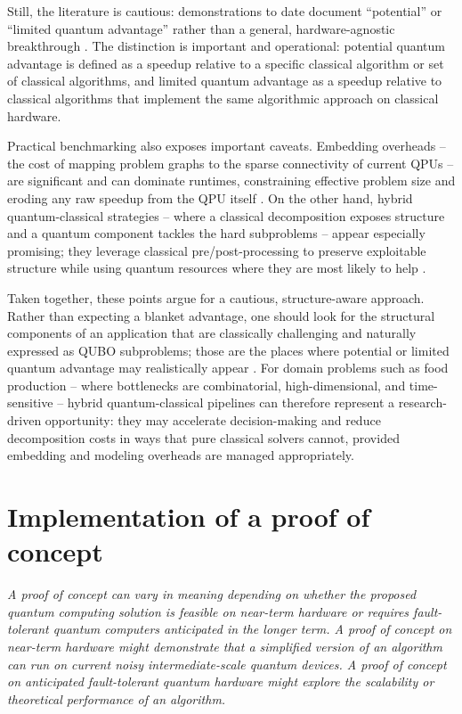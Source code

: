 \documentclass{oqireport}
\begin{document}
Still, the literature is cautious: demonstrations to date document ``potential'' or ``limited quantum advantage'' rather than a general, hardware-agnostic breakthrough \cite{hoefler2023disentanglinghypepracticalityrealistically,ronnow2014defining}. The distinction is important and operational: potential quantum advantage is defined as a speedup relative to a specific classical algorithm or set of classical algorithms, and limited quantum advantage as a speedup relative to classical algorithms that implement the same algorithmic approach on classical hardware.

Practical benchmarking also exposes important caveats. Embedding overheads -- the cost of mapping problem graphs to the sparse connectivity of current QPUs -- are significant and can dominate runtimes, constraining effective problem size and eroding any raw speedup from the QPU itself \cite{ReinholdssonOdelius2023,naghmouchi_mixed_2024}. On the other hand, hybrid quantum-classical strategies -- where a classical decomposition exposes structure and a quantum component tackles the hard subproblems -- appear especially promising; they leverage classical pre/post-processing to preserve exploitable structure while using quantum resources where they are most likely to help \cite{franco_efficient_2023,VallejoBenitezCano2021}.

Taken together, these points argue for a cautious, structure-aware approach. Rather than expecting a blanket advantage, one should look for the structural components of an application that are classically challenging and naturally expressed as QUBO subproblems; those are the places where potential or limited quantum advantage may realistically appear \cite{ajagekar_quantum_2020,ronnow2014defining}. For domain problems such as food production -- where bottlenecks are combinatorial, high-dimensional, and time-sensitive -- hybrid quantum-classical pipelines can therefore represent a research-driven opportunity: they may accelerate decision-making and reduce decomposition costs in ways that pure classical solvers cannot, provided embedding and modeling overheads are managed appropriately.

\section{Implementation of a proof of concept}

\textit{
A proof of concept can vary in meaning depending on whether the proposed quantum computing solution is feasible on near-term hardware or requires fault-tolerant quantum computers anticipated in the longer term.
A proof of concept on near-term hardware might demonstrate that a simplified version of an algorithm can run on current noisy intermediate-scale quantum devices. 
A proof of concept on anticipated fault-tolerant quantum hardware might explore the scalability or theoretical performance of an algorithm.
}
\end{document}
